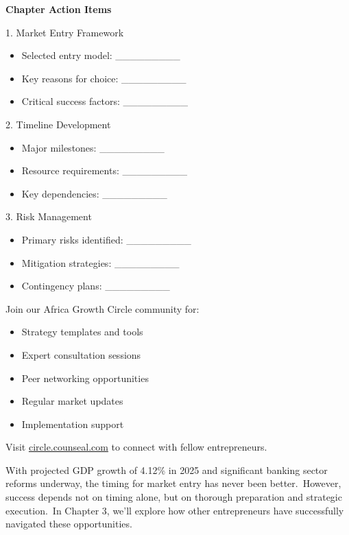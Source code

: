\begin{workshopbox}
\textbf{Chapter Action Items}

1. Market Entry Framework
\begin{itemize}
    \item Selected entry model: \_\_\_\_\_\_\_\_\_
    \item Key reasons for choice: \_\_\_\_\_\_\_\_\_
    \item Critical success factors: \_\_\_\_\_\_\_\_\_
\end{itemize}

2. Timeline Development
\begin{itemize}
    \item Major milestones: \_\_\_\_\_\_\_\_\_
    \item Resource requirements: \_\_\_\_\_\_\_\_\_
    \item Key dependencies: \_\_\_\_\_\_\_\_\_
\end{itemize}

3. Risk Management
\begin{itemize}
    \item Primary risks identified: \_\_\_\_\_\_\_\_\_
    \item Mitigation strategies: \_\_\_\_\_\_\_\_\_
    \item Contingency plans: \_\_\_\_\_\_\_\_\_
\end{itemize}
\end{workshopbox}

\begin{communitybox}
Join our Africa Growth Circle community for:
\begin{itemize}
    \item Strategy templates and tools
    \item Expert consultation sessions
    \item Peer networking opportunities
    \item Regular market updates
    \item Implementation support
\end{itemize}
Visit \href{https://viz.li/csl-book-circle}{circle.counseal.com} to connect with fellow entrepreneurs.
\end{communitybox}

\begin{importantbox}
With projected GDP growth of 4.12\% in 2025 and significant banking sector reforms underway, the timing for market entry has never been better.\ However, success depends not on timing alone, but on thorough preparation and strategic execution.\ In Chapter 3, we'll explore how other entrepreneurs have successfully navigated these opportunities.
\end{importantbox}